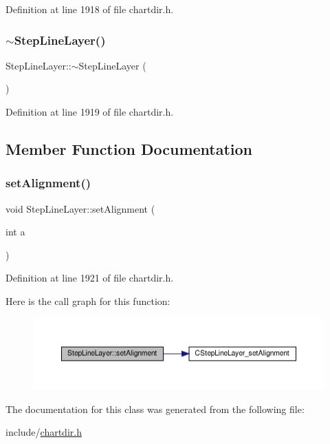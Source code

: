 Definition at line 1918 of file chartdir.\+h.

\mbox{\label{class_step_line_layer_a9bd122f19f51a1b8736be3b1557b6eba}} 
\subsubsection{\texorpdfstring{$\sim$\+Step\+Line\+Layer()}{~StepLineLayer()}}
{\footnotesize\ttfamily Step\+Line\+Layer\+::$\sim$\+Step\+Line\+Layer (\begin{DoxyParamCaption}{ }\end{DoxyParamCaption})\hspace{0.3cm}{\ttfamily [inline]}}



Definition at line 1919 of file chartdir.\+h.



\subsection{Member Function Documentation}
\mbox{\label{class_step_line_layer_afe0552f1c6e760ddf99d492e80163039}} 
\subsubsection{\texorpdfstring{set\+Alignment()}{setAlignment()}}
{\footnotesize\ttfamily void Step\+Line\+Layer\+::set\+Alignment (\begin{DoxyParamCaption}\item[{int}]{a }\end{DoxyParamCaption})\hspace{0.3cm}{\ttfamily [inline]}}



Definition at line 1921 of file chartdir.\+h.

Here is the call graph for this function\+:
\nopagebreak
\begin{figure}[H]
\begin{center}
\leavevmode
\includegraphics[width=350pt]{class_step_line_layer_afe0552f1c6e760ddf99d492e80163039_cgraph}
\end{center}
\end{figure}


The documentation for this class was generated from the following file\+:\begin{DoxyCompactItemize}
\item 
include/\hyperlink{chartdir_8h}{chartdir.\+h}\end{DoxyCompactItemize}
